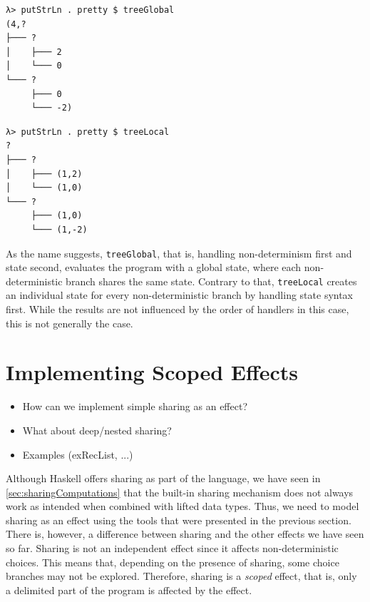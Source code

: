 \documentclass[a4paper, 11pt, fleqn, twoside]{scrreprt}
\newcommand{\hinl}[1]{\texttt{#1}}
\begin{document}
\vspace{0.32cm}

\begin{minipage}{.465 \linewidth}
\begin{verbatim}
λ> putStrLn . pretty $ treeGlobal
(4,?
├─── ?
│    ├─── 2
│    └─── 0
└─── ?
     ├─── 0
     └─── -2)
\end{verbatim}
\end{minipage}
\hfill
\vline
\hfill
\begin{minipage}{.475 \linewidth}
\begin{verbatim}
λ> putStrLn . pretty $ treeLocal
?
├─── ?
│    ├─── (1,2)
│    └─── (1,0)
└─── ?
     ├─── (1,0)
     └─── (1,-2)
\end{verbatim}
\end{minipage}

\vspace{0.32cm}

As the name suggests, \hinl{treeGlobal}, that is, handling non-determinism first and state second, evaluates the program with a global state, where each non-deterministic branch shares the same state.
Contrary to that, \hinl{treeLocal} creates an individual state for every non-deterministic branch by handling state syntax first.
While the results are not influenced by the order of handlers in this case, this is not generally the case.

\section{Implementing Scoped Effects}
\label{sec:sharing}
\begin{itemize}
\item How can we implement simple sharing as an effect?
\item What about deep/nested sharing?
\item Examples (exRecList, ...)
\end{itemize}

Although Haskell offers sharing as part of the language, we have seen in \autoref{sec:sharingComputations} that the built-in sharing mechanism does not always work as intended when combined with lifted data types.
Thus, we need to model sharing as an effect using the tools that were presented in the previous section.
There is, however, a difference between sharing and the other effects we have seen so far.
Sharing is not an independent effect since it affects non-deterministic choices.
This means that, depending on the presence of sharing, some choice branches may not be explored.
Therefore, sharing is a \textit{scoped} effect, that is, only a delimited part of the program is affected by the effect.
\end{document}
